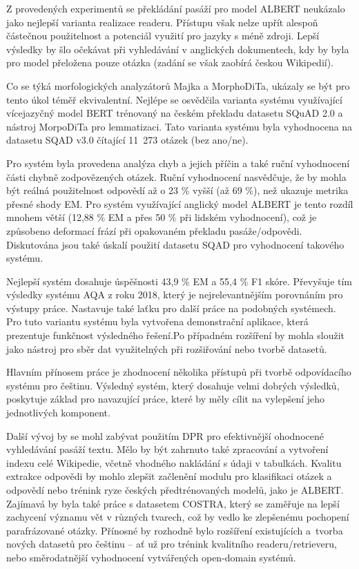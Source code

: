 Z provedených experimentů se překládání pasáží pro model ALBERT neukázalo jako nejlepší varianta realizace readeru. Přístupu však nelze upřít alespoň částečnou použitelnost a potenciál využití pro jazyky s méně zdroji. Lepší výsledky by šlo očekávat při vyhledávání v anglických dokumentech, kdy by byla pro model přeložena pouze otázka (zadání se však zaobírá českou Wikipedií).\par
Co se týká morfologických analyzátorů Majka a MorphoDiTa, ukázaly se být pro tento úkol téměř ekvivalentní. Nejlépe se osvědčila varianta systému využívající vícejazyčný model BERT trénovaný na českém překladu datasetu SQuAD 2.0 a nástroj MorpoDiTa pro lemmatizaci. Tato varianta systému byla vyhodnocena na datasetu SQAD v3.0 čítající 11~273 otázek (bez ano/ne).\par
Pro systém byla provedena analýza chyb a jejich příčin a také ruční vyhodnocení části chybně zodpovězených otázek. Ruční vyhodnocení nasvědčuje, že by mohla být reálná použitelnost odpovědí až o 23 \% vyšší (až 69 \%), než ukazuje metrika přesné shody EM. Pro systém využívající anglický model ALBERT je tento rozdíl mnohem větší (12,88 \% EM a přes 50 \% při lidském vyhodnocení), což je způsobeno deformací frází při opakovaném překladu pasáže/odpovědi. Diskutována jsou také úskalí použití datasetu SQAD pro vyhodnocení takového systému.\par

Nejlepší systém dosahuje úspěšnosti 43,9 \% EM a 55,4 \% F1 skóre. Převyšuje tím výsledky systému AQA z roku 2018, který je nejrelevantnějším porovnáním pro výstupy práce. Nastavuje také laťku pro další práce na podobných systémech. Pro tuto variantu systému byla vytvořena demonstrační aplikace, která prezentuje funkčnost výsledného řešení.\linebreak Po případném rozšíření by mohla sloužit jako nástroj pro sběr dat využitelných při rozšiřování nebo tvorbě datasetů.\par

Hlavním přínosem práce je zhodnocení několika přístupů při tvorbě odpovídacího systému pro češtinu. Výsledný systém, který dosahuje velmi dobrých výsledků, poskytuje základ pro navazující práce, které by měly cílit na vylepšení jeho jednotlivých komponent.\par
\smallskip
Další vývoj by se mohl zabývat použitím DPR pro efektivnější ohodnocené vyhledávání pasáží textu. Mělo by být zahrnuto také zpracování a vytvoření indexu celé Wikipedie, včetně vhodného nakládání s údaji v tabulkách. Kvalitu extrakce odpovědi by mohlo zlepšit začlenění modulu pro klasifikaci otázek a odpovědí nebo trénink ryze českých předtrénovaných modelů, jako je ALBERT. Zajímavá by byla také práce s datasetem COSTRA, který se zaměřuje na lepší zachycení významu vět v různých tvarech, což by vedlo ke zlepšenému pochopení parafrázované otázky. Přínosné by rozhodně bylo rozšíření existujících a~tvorba nových datasetů pro češtinu -- ať už pro trénink kvalitního readeru/retrieveru, nebo směrodatnější vyhodnocení vytvářených open-domain systémů.

